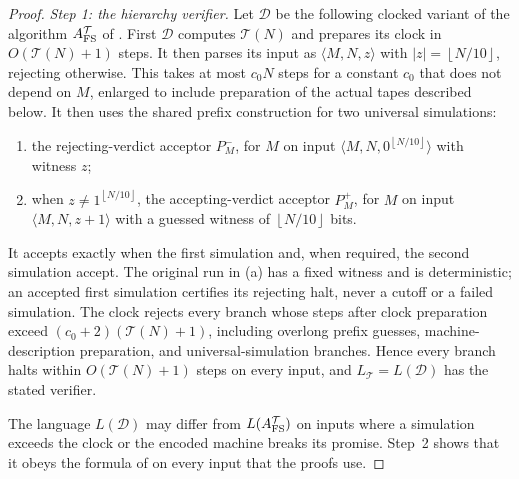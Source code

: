 \documentclass[11pt,letterpaper]{article}
\theoremstyle{definition}
\theoremstyle{remark}
\newcommand{\floor}[1]{\left\lfloor #1\right\rfloor}
\newcommand{\abs}[1]{\left|#1\right|}
\newcommand{\Tclk}{\mathcal T}
\begin{document}
\begin{proof}
\emph{Step 1: the hierarchy verifier.} Let \(\mathcal D\) be the following
clocked variant of the algorithm \(A^{\Tclk}_{\rm FS}\) of
\cite[Definition~4.2]{CLW20}. First \(\mathcal D\) computes \(\Tclk(N)\)
and prepares its clock in \(O(\Tclk(N)+1)\) steps.
It then parses its input as \(\langle M,N,z\rangle\) with
\(\abs z=\floor{N/10}\), rejecting otherwise. This takes at most \(c_0N\)
steps for a constant \(c_0\) that does not depend on \(M\), enlarged
to include preparation of the actual tapes described below. It then
uses the shared prefix construction for two universal simulations:
\begin{enumerate}[label=(\alph*)]
\item the rejecting-verdict acceptor \(P_M^-\), for \(M\) on input
\(\langle M,N,0^{\floor{N/10}}\rangle\) with witness \(z\);
\item when \(z\ne1^{\floor{N/10}}\), the accepting-verdict acceptor
\(P_M^+\), for \(M\) on input
\(\langle M,N,z+1\rangle\) with a guessed witness of \(\floor{N/10}\)
bits.
\end{enumerate}
It accepts exactly when the first simulation and, when required, the
second simulation accept. The original run in (a) has a fixed witness
and is deterministic; an accepted first simulation certifies its
rejecting halt, never a cutoff or a failed simulation. The clock
rejects every branch whose steps after clock preparation exceed
\((c_0+2)(\Tclk(N)+1)\), including overlong prefix guesses,
machine-description preparation, and universal-simulation branches.
Hence every branch halts within \(O(\Tclk(N)+1)\) steps on every
input, and \(L_{\Tclk}=L(\mathcal D)\) has the stated verifier.

The language \(L(\mathcal D)\) may differ from \(L(A^{\Tclk}_{\rm FS})\)
on inputs where a simulation exceeds the clock or the encoded machine
breaks its promise. Step~2 shows that it obeys the formula of
\cite[Lemma~4.3]{CLW20} on every input that the proofs use.


\end{proof}
\end{document}
